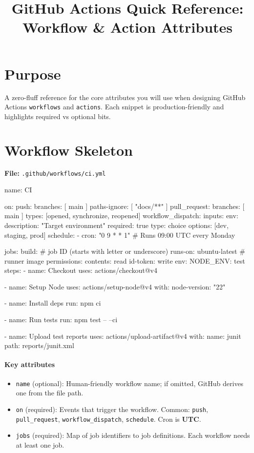 \documentclass[11pt]{article}
\title{\textbf{GitHub Actions Quick Reference: Workflow \& Action Attributes}}
\author{}
\date{}
\begin{document}
\maketitle

\section*{Purpose}
A zero-fluff reference for the core attributes you will use when designing GitHub Actions \texttt{workflows} and \texttt{actions}. Each snippet is production-friendly and highlights required vs optional bits.

\section{Workflow Skeleton}
\textbf{File:} \texttt{.github/workflows/ci.yml}
\begin{yamlcode}
name: CI

on:
  push:
    branches: [ main ]
    paths-ignore: [ "docs/**" ]
  pull_request:
    branches: [ main ]
    types: [opened, synchronize, reopened]
  workflow_dispatch:
    inputs:
      env:
        description: "Target environment"
        required: true
        type: choice
        options: [dev, staging, prod]
  schedule:
    - cron: "0 9 * * 1"   # Runs 09:00 UTC every Monday

jobs:
  build:                   # job ID (starts with letter or underscore)
    runs-on: ubuntu-latest # runner image
    permissions:
      contents: read
      id-token: write
    env:
      NODE_ENV: test
    steps:
      - name: Checkout
        uses: actions/checkout@v4

      - name: Setup Node
        uses: actions/setup-node@v4
        with:
          node-version: "22"

      - name: Install deps
        run: npm ci

      - name: Run tests
        run: npm test -- --ci

      - name: Upload test reports
        uses: actions/upload-artifact@v4
        with:
          name: junit
          path: reports/junit.xml
\end{yamlcode}

\paragraph{Key attributes}
\begin{itemize}
  \item \texttt{name} (optional): Human-friendly workflow name; if omitted, GitHub derives one from the file path.
  \item \texttt{on} (required): Events that trigger the workflow. Common: \texttt{push}, \texttt{pull\_request}, \texttt{workflow\_dispatch}, \texttt{schedule}. Cron is \textbf{UTC}.
  \item \texttt{jobs} (required): Map of job identifiers to job definitions. Each workflow needs at least one job.
\end{itemize}
\end{document}

